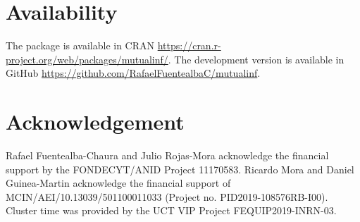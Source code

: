 \section{Availability}
The package is available in CRAN \url{https://cran.r-project.org/web/packages/mutualinf/}. The development version is available in GitHub \url{https://github.com/RafaelFuentealbaC/mutualinf}.

\section{Acknowledgement}
Rafael Fuentealba-Chaura and Julio Rojas-Mora acknowledge the financial support by the FONDECYT/ANID Project 11170583. Ricardo Mora and Daniel Guinea-Martin acknowledge the financial support of MCIN/AEI/10.13039/501100011033 (Project no. PID2019-108576RB-I00). Cluster time was provided by the UCT VIP Project FEQUIP2019-INRN-03.

